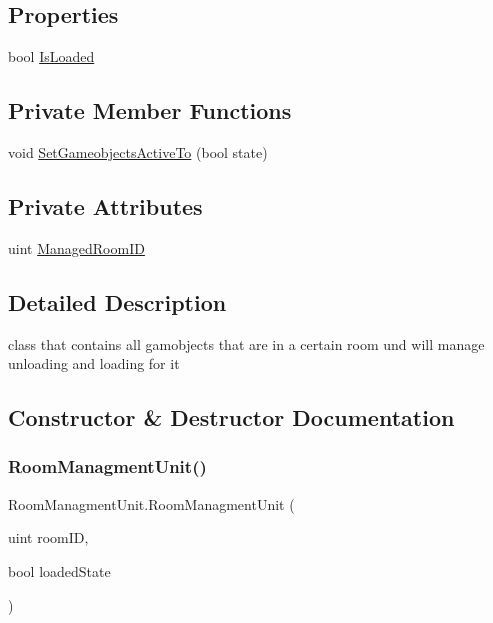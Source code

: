 \subsection*{Properties}
\begin{DoxyCompactItemize}
\item 
bool \mbox{\hyperlink{class_room_managment_unit_a221d94b284d9888e753699938f9e7809}{Is\+Loaded}}
\end{DoxyCompactItemize}
\subsection*{Private Member Functions}
\begin{DoxyCompactItemize}
\item 
void \mbox{\hyperlink{class_room_managment_unit_ae39467cac522f23c198693c215968ad7}{Set\+Gameobjects\+Active\+To}} (bool state)
\end{DoxyCompactItemize}
\subsection*{Private Attributes}
\begin{DoxyCompactItemize}
\item 
uint \mbox{\hyperlink{class_room_managment_unit_a3a8836466231ec4cc95a2328cf246a75}{Managed\+Room\+ID}}
\end{DoxyCompactItemize}


\subsection{Detailed Description}
class that contains all gamobjects that are in a certain room und will manage unloading and loading for it 



\subsection{Constructor \& Destructor Documentation}
\mbox{\label{class_room_managment_unit_ad9c4cf6c496f32f6e0edbe47a4bf0295}} 
\subsubsection{\texorpdfstring{Room\+Managment\+Unit()}{RoomManagmentUnit()}}
{\footnotesize\ttfamily Room\+Managment\+Unit.\+Room\+Managment\+Unit (\begin{DoxyParamCaption}\item[{uint}]{room\+ID,  }\item[{bool}]{loaded\+State }\end{DoxyParamCaption})}

